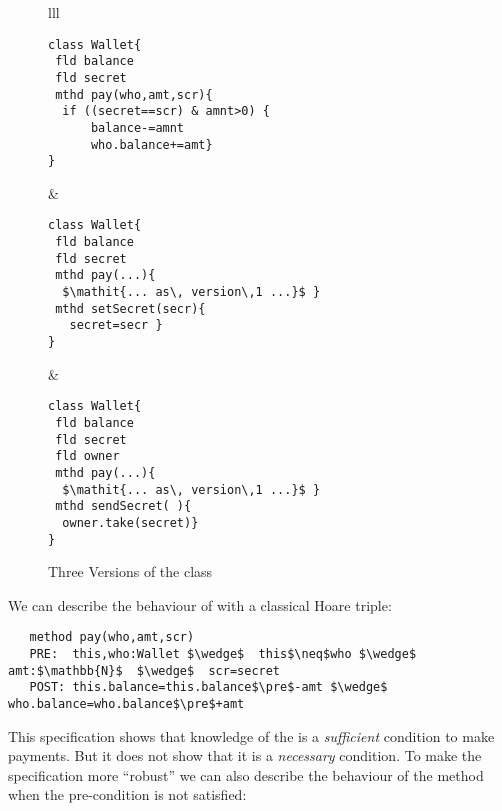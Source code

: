 \begin{figure}[htb]
\begin{tabular}{lll}
\begin{minipage}{0.37\textwidth}
\vspace*{-0.5cm}
\begin{lstlisting}
class Wallet{
 fld balance 
 fld secret 
 mthd pay(who,amt,scr){
  if ((secret==scr) & amnt>0) {
      balance-=amnt
      who.balance+=amt}
}
\end{lstlisting}
\end{minipage}
  & 
\begin{minipage}{0.29\textwidth}
\vspace*{-0.5cm}
\begin{lstlisting}
class Wallet{
 fld balance  
 fld secret  
 mthd pay(...){
  $\mathit{... as\, version\,1 ...}$ }
 mthd setSecret(secr){
   secret=secr }
}

\end{lstlisting}
\end{minipage} &  
\begin{minipage}{0.34\textwidth}
\vspace*{-0.5cm}
\begin{lstlisting}
class Wallet{
 fld balance  
 fld secret  
 fld owner  
 mthd pay(...){
  $\mathit{... as\, version\,1 ...}$ }
 mthd sendSecret( ){
  owner.take(secret)}  
}
\end{lstlisting}
  \end{minipage}
 \end{tabular}
  \vspace*{-0.95cm}
  \caption{Three Versions of the class }
 \label{fig:Example}
 \end{figure}


\noindent We can describe the behaviour of  with 
a classical Hoare triple:
 
\begin{lstlisting}
   method pay(who,amt,scr)
   PRE:  this,who:Wallet $\wedge$  this$\neq$who $\wedge$ amt:$\mathbb{N}$  $\wedge$  scr=secret   
   POST: this.balance=this.balance$\pre$-amt $\wedge$ who.balance=who.balance$\pre$+amt 
 \end{lstlisting}
\vspace{-.2in}
This specification shows that knowledge of the  is a \emph{sufficient} condition to make payments. 
But it does not show that it is a \emph{necessary} condition. To make the specification  
  more ``robust'' we can also describe the behaviour of the 
  method when the pre-condition is not satisfied:

